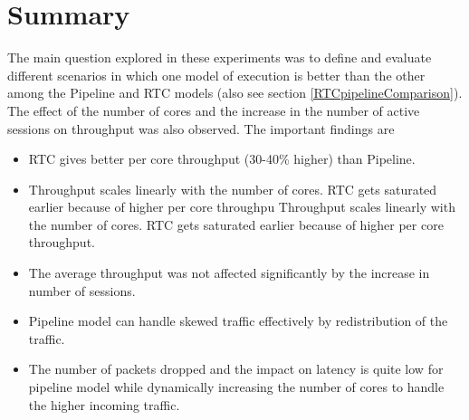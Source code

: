\section{Summary \label{secSummaryResults}}
The main question explored in these experiments was to define and evaluate different scenarios in which one model of execution is better than the other among the Pipeline and RTC models (also see section \ref{RTCpipelineComparison}). The effect of  the number of cores and the increase  in the number of  active sessions on throughput was also observed.
The important findings are 
\begin{itemize}
    \item RTC gives better per core throughput (30-40\% higher) than Pipeline.
    \item Throughput scales linearly with the number of cores. RTC gets saturated earlier because of higher per core throughpu Throughput scales linearly with the number of cores. RTC gets saturated earlier because of higher per core throughput. 
    \item The average throughput was not affected significantly by the increase in number of sessions.
    \item Pipeline model can handle skewed traffic effectively by redistribution of the traffic. 
    \item The number of packets dropped and  the impact on latency is quite low  for pipeline model while dynamically increasing the number of cores to handle the higher incoming traffic.

\end{itemize}